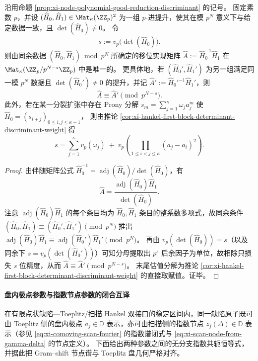 \begin{corollary}\label{cor:xi-gramshift-padic-effective-precision}
沿用命题 \ref{prop:xi-node-polynomial-good-reduction-discriminant} 的记号。
固定素数 \(p\)，并设 \((\widehat H_0,\widehat H_1)\in\Mat_\kappa(\ZZ_p)^2\) 为一组 \(p\)-进提升，使其在模 \(p^N\) 意义下与给定数据一致，且 \(\det(\widehat H_0)\ne 0\)。
令
\[
s:=v_p\!\bigl(\det(\widehat H_0)\bigr).
\]
则由同余数据 \((\widehat H_0,\widehat H_1)\bmod p^N\) 所确定的移位实现矩阵 \(\widehat A:=\widehat H_0^{-1}\widehat H_1\) 在 \(\Mat_\kappa(\ZZ_p/p^{N-s}\ZZ_p)\) 中是唯一的。
更具体地，若 \((\widehat H_0',\widehat H_1')\) 为另一组满足同一模 \(p^N\) 数据且 \(\det(\widehat H_0')\ne 0\) 的提升，并记 \(\widehat A':=\widehat H_0'^{-1}\widehat H_1'\)，则
\[
\widehat A\equiv \widehat A'\pmod{p^{N-s}}.
\]
此外，若在某一分裂扩张中存在 Prony 分解 \(s_m=\sum_{j=1}^{\kappa}\omega_j a_j^m\) 使
\(
\widehat H_0=(s_{i+j})_{0\le i,j\le \kappa-1}
\)，
则由推论 \ref{cor:xi-hankel-first-block-determinant-discriminant-weight} 得
\[
s=\sum_{j=1}^{\kappa}v_p(\omega_j)\;+\;v_p\!\left(\prod_{1\le i<j\le\kappa}(a_j-a_i)^2\right).
\]
\end{corollary}
\begin{proof}
由伴随矩阵公式
\(
\widehat H_0^{-1}=\operatorname{adj}(\widehat H_0)/\det(\widehat H_0)
\)，有
\[
\widehat A=\frac{\operatorname{adj}(\widehat H_0)\widehat H_1}{\det(\widehat H_0)}.
\]
注意 \(\operatorname{adj}(\widehat H_0)\widehat H_1\) 的每个条目均为 \(\widehat H_0,\widehat H_1\) 条目的整系数多项式，故同余条件
\(
(\widehat H_0,\widehat H_1)\equiv(\widehat H_0',\widehat H_1')\pmod{p^N}
\)
推出
\(
\operatorname{adj}(\widehat H_0)\widehat H_1\equiv \operatorname{adj}(\widehat H_0')\widehat H_1'\pmod{p^N}
\)。
再由 \(v_p(\det(\widehat H_0))=s\)（以及同余下 \(s=v_p(\det(\widehat H_0'))\)）可知分母提取出 \(p^s\) 后余因子为单位，故相除只损失 \(s\) 位精度，从而
\(
\widehat A\equiv \widehat A'\pmod{p^{N-s}}
\)。
末尾估值分解为推论 \ref{cor:xi-hankel-first-block-determinant-discriminant-weight} 的直接取赋值。证毕。
\end{proof}

\paragraph{盘内极点参数与指数节点参数的闭合互译}
在有限点状缺陷—Toeplitz/扫描 Hankel 双接口的稳定区间内，同一缺陷原子既可由 Toeplitz 侧的盘内极点 \(a_j\in\mathbb{D}\) 表示，亦可由扫描侧的指数节点 \(z_j(\Delta)\in\mathbb{D}\) 表示（参见 \eqref{eq:xi-comoving-scan-fourier} 的指数谱闭式与 \eqref{eq:xi-scan-node-from-gamma-delta} 的节点定义）。
下面给出两种参数之间的无分支指数共轭恒等式，并据此把 Gram--shift 节点谱与 Toeplitz 盘几何严格对齐。

